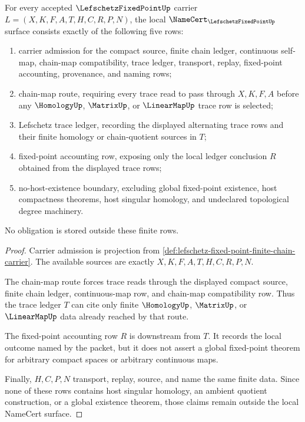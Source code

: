 \begin{theorem}
\label{thm:lefschetz-fixed-point-namecert-obligations}
For every accepted $\LefschetzFixedPointUp$ carrier $L=(X,K,F,A,T,H,C,R,P,N)$, the local $\NameCert_{\LefschetzFixedPointUp}$ surface consists exactly of the following five rows:
\begin{enumerate}
\item carrier admission for the compact source, finite chain ledger, continuous self-map, chain-map compatibility, trace ledger, transport, replay, fixed-point accounting, provenance, and naming rows;
\item chain-map route, requiring every trace read to pass through $X,K,F,A$ before any $\HomologyUp$, $\MatrixUp$, or $\LinearMapUp$ trace row is selected;
\item Lefschetz trace ledger, recording the displayed alternating trace rows and their finite homology or chain-quotient sources in $T$;
\item fixed-point accounting row, exposing only the local ledger conclusion $R$ obtained from the displayed trace rows;
\item no-host-existence boundary, excluding global fixed-point existence, host compactness theorems, host singular homology, and undeclared topological degree machinery.
\end{enumerate}
No obligation is stored outside these finite rows.
\end{theorem}
\begin{proof}
Carrier admission is projection from \autoref{def:lefschetz-fixed-point-finite-chain-carrier}. The available sources are exactly $X,K,F,A,T,H,C,R,P,N$.

The chain-map route forces trace reads through the displayed compact source, finite chain ledger, continuous-map row, and chain-map compatibility row. Thus the trace ledger $T$ can cite only finite $\HomologyUp$, $\MatrixUp$, or $\LinearMapUp$ data already reached by that route.

The fixed-point accounting row $R$ is downstream from $T$. It records the local outcome named by the packet, but it does not assert a global fixed-point theorem for arbitrary compact spaces or arbitrary continuous maps.

Finally, $H,C,P,N$ transport, replay, source, and name the same finite data. Since none of these rows contains host singular homology, an ambient quotient construction, or a global existence theorem, those claims remain outside the local NameCert surface.
\end{proof}

